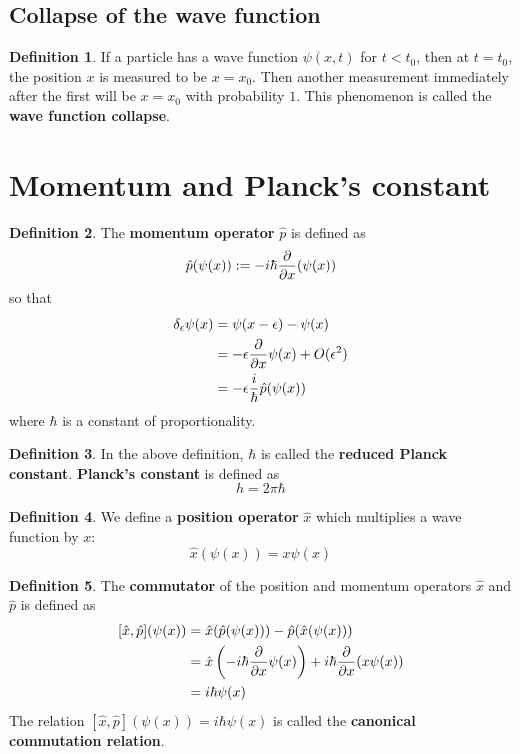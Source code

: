 \documentclass[12pt,a4paper]{article}
\theoremstyle{definition}
\newtheorem{definition}{Definition}[subsection]
\begin{document}
\subsection{Collapse of the wave function}

\begin{definition}
	If a particle has a wave function $\psi(x, t)$ for $t < t_0$, then at $t = t_0$, the position $x$ is measured to be $x = x_0$. Then another measurement immediately after the first will be $x = x_0$ with probability $1$. This phenomenon is called the \textbf{wave function collapse}.
\end{definition}

\section{Momentum and Planck's constant}

\begin{definition}
	The \textbf{momentum operator} $\hat{p}$ is defined as
	\[
		\hat{p} (\psi(x)) := -i \hbar \diffp{}{x} (\psi(x))
	\]
	so that
	\[
		\begin{aligned}
			\delta_{\epsilon} \psi(x)
				& = \psi(x - \epsilon) - \psi(x) \\
				& = -\epsilon \diffp{}{x} \psi(x) + O(\epsilon^2) \\
				& = -\epsilon \frac{i}{\hbar} \hat{p} (\psi(x))
		\end{aligned}
	\]
	where $\hbar$ is a constant of proportionality.
\end{definition}

\begin{definition}
	In the above definition, $\hbar$ is called the \textbf{reduced Planck constant}. \textbf{Planck's constant} is defined as
	\[
		h = 2 \pi \hbar
	\]
\end{definition}

\begin{definition}
	We define a \textbf{position operator} $\hat{x}$ which multiplies a wave function by $x$:
	\[
		\hat{x} (\psi(x)) = x \psi(x)
	\]
\end{definition}

\begin{definition}
	The \textbf{commutator} of the position and momentum operators $\hat{x}$ and $\hat{p}$ is defined as
	\[
		\begin{aligned}
			\relax [\hat{x}, \hat{p}] (\psi(x))
				& = \hat{x} (\hat{p} (\psi(x))) - \hat{p} (\hat{x} (\psi(x))) \\
				& = \hat{x} \left( -i \hbar \diffp{}{x} \psi(x) \right)	+ i \hbar \diffp{}{x} (x \psi(x)) \\
				& = i \hbar \psi(x)
		\end{aligned}
	\]
	The relation $[\hat{x}, \hat{p}] (\psi(x)) = i \hbar \psi(x)$ is called the \textbf{canonical commutation relation}.
\end{definition}
\end{document}

